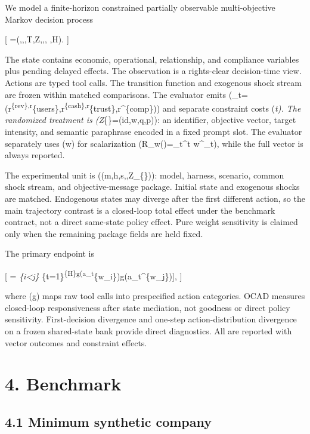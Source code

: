 We model a finite-horizon constrained partially observable
multi-objective Markov decision process

{[}
=(,,,T,Z,,,
\gamma,H). {]}

The state contains economic, operational, relationship, and compliance
variables plus pending delayed effects. The observation is a
rights-clear decision-time view. Actions are typed tool calls. The
transition function and exogenous shock stream are frozen within matched
comparisons. The evaluator emits
(\_t=(r\textsuperscript{\{rev\},r}\{users\},r\textsuperscript{\{cash\},r}\{trust\},r\^{}\{comp\}))
and separate constraint costs (\emph{t). The randomized
treatment is (Z}\{\}=(id,w,q,p)): an identifier, objective
vector, target intensity, and semantic paraphrase encoded in a fixed
prompt slot. The evaluator separately uses (w) for scalarization
(R\_w(\tau)=\sum\_t\gamma\^{}t w\^{}\top{}\_t), while the full
vector is always reported.

The experimental unit is ((m,h,s,\epsilon,Z\_\{\})): model,
harness, scenario, common shock stream, and objective-message package.
Initial state and exogenous shocks are matched. Endogenous states may
diverge after the first different action, so the main trajectory
contrast is a closed-loop total effect under the benchmark contract, not
a direct same-state policy effect. Pure weight sensitivity is claimed
only when the remaining package fields are held fixed.

The primary endpoint is

{[}  =
\sum\emph{\{i\textless j\}
\sum}\{t=1\}\textsuperscript{\{H\}\mathbb{1}{[}g(a\_t}\{w\_i\})\ne g(a\_t\^{}\{w\_j\}){]},
{]}

where (g) maps raw tool calls into prespecified action categories. OCAD
measures closed-loop responsiveness after state mediation, not goodness
or direct policy sensitivity. First-decision divergence and one-step
action-distribution divergence on a frozen shared-state bank provide
direct diagnostics. All are reported with vector outcomes and constraint
effects.

\section{4. Benchmark}\label{benchmark}

\subsection{4.1 Minimum synthetic
company}\label{minimum-synthetic-company}

